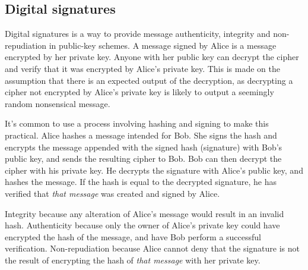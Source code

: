 \subsection{Digital signatures}

Digital signatures is a way to provide message authenticity, integrity and non-repudiation in public-key schemes. A message signed by Alice is a message encrypted by her private key. Anyone with her public key can decrypt the cipher and verify that it was encrypted by Alice's private key. This is made on the assumption that there is an expected output of the decryption, as decrypting a cipher not encrypted by Alice's private key is likely to output a seemingly random nonsensical message. 

It's common to use a process involving hashing and signing to make this practical. Alice hashes a message intended for Bob. She signs the hash and encrypts the message appended with the signed hash (signature) with Bob's public key, and sends the resulting cipher to Bob. Bob can then decrypt the cipher with his private key. He decrypts the signature with Alice's public key, and hashes the message. If the hash is equal to the decrypted signature, he has verified that \emph{that message} was created and signed by Alice. 

Integrity because any alteration of Alice's message would result in an invalid hash.
Authenticity because only the owner of Alice's private key could have encrypted the hash of the message, and have Bob perform a successful verification. 
Non-repudiation because Alice cannot deny that the signature is not the result of encrypting the hash of \emph{that message} with her private key. 
